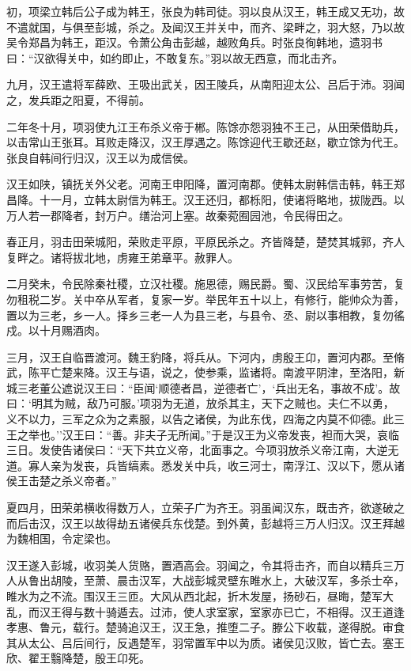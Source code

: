 \documentclass[]{article}
\begin{document}
初，项梁立韩后公子成为韩王，张良为韩司徒。羽以良从汉王，韩王成又无功，故不遣就国，与俱至彭城，杀之。及闻汉王并关中，而齐、梁畔之，羽大怒，乃以故吴令郑昌为韩王，距汉。令萧公角击彭越，越败角兵。时张良徇韩地，遗羽书曰：``汉欲得关中，如约即止，不敢复东。''羽以故无西意，而北击齐。

九月，汉王遣将军薛欧、王吸出武关，因王陵兵，从南阳迎太公、吕后于沛。羽闻之，发兵距之阳夏，不得前。

二年冬十月，项羽使九江王布杀义帝于郴。陈馀亦怨羽独不王己，从田荣借助兵，以击常山王张耳。耳败走降汉，汉王厚遇之。陈馀迎代王歇还赵，歇立馀为代王。张良自韩间行归汉，汉王以为成信侯。

汉王如陕，镇抚关外父老。河南王申阳降，置河南郡。使韩太尉韩信击韩，韩王郑昌降。十一月，立韩太尉信为韩王。汉王还归，都栎阳，使诸将略地，拔陇西。以万人若一郡降者，封万户。缮治河上塞。故秦菀囿园池，令民得田之。

春正月，羽击田荣城阳，荣败走平原，平原民杀之。齐皆降楚，楚焚其城郭，齐人复畔之。诸将拔北地，虏雍王弟章平。赦罪人。

二月癸未，令民除秦社稷，立汉社稷。施恩德，赐民爵。蜀、汉民给军事劳苦，复勿租税二岁。关中卒从军者，复家一岁。举民年五十以上，有修行，能帅众为善，置以为三老，乡一人。择乡三老一人为县三老，与县令、丞、尉以事相教，复勿徭戍。以十月赐酒肉。

三月，汉王自临晋渡河。魏王豹降，将兵从。下河内，虏殷王卬，置河内郡。至脩武，陈平亡楚来降。汉王与语，说之，使参乘，监诸将。南渡平阴津，至洛阳，新城三老董公遮说汉王曰：``臣闻`顺德者昌，逆德者亡'，`兵出无名，事故不成'。故曰：`明其为贼，敌乃可服。'项羽为无道，放杀其主，天下之贼也。夫仁不以勇，义不以力，三军之众为之素服，以告之诸侯，为此东伐，四海之内莫不仰德。此三王之举也。''汉王曰：``善。非夫子无所闻。''于是汉王为义帝发丧，袒而大哭，哀临三日。发使告诸侯曰：``天下共立义帝，北面事之。今项羽放杀义帝江南，大逆无道。寡人亲为发丧，兵皆缟素。悉发关中兵，收三河士，南浮江、汉以下，愿从诸侯王击楚之杀义帝者。''

夏四月，田荣弟横收得数万人，立荣子广为齐王。羽虽闻汉东，既击齐，欲遂破之而后击汉，汉王以故得劫五诸侯兵东伐楚。到外黄，彭越将三万人归汉。汉王拜越为魏相国，令定梁也。

汉王遂入彭城，收羽美人货赂，置酒高会。羽闻之，令其将击齐，而自以精兵三万人从鲁出胡陵，至萧、晨击汉军，大战彭城灵壁东睢水上，大破汉军，多杀士卒，睢水为之不流。围汉王三匝。大风从西北起，折木发屋，扬砂石，昼晦，楚军大乱，而汉王得与数十骑遁去。过沛，使人求室家，室家亦已亡，不相得。汉王道逢孝惠、鲁元，载行。楚骑追汉王，汉王急，推堕二子。滕公下收载，遂得脱。审食其从太公、吕后间行，反遇楚军，羽常置军中以为质。诸侯见汉败，皆亡去。塞王欣、翟王翳降楚，殷王卬死。
\end{document}
